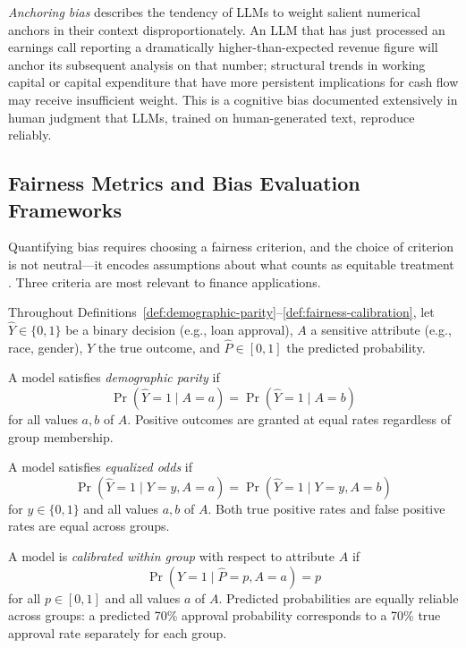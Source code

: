 \begin{context}
\emph{Anchoring bias} describes the tendency of LLMs to weight salient numerical anchors in their context disproportionately. An LLM that has just processed an earnings call reporting a dramatically higher-than-expected revenue figure will anchor its subsequent analysis on that number; structural trends in working capital or capital expenditure that have more persistent implications for cash flow may receive insufficient weight. This is a cognitive bias documented extensively in human judgment \cite{tversky1974judgment}
that LLMs, trained on human-generated text, reproduce reliably.

\subsection{Fairness Metrics and Bias Evaluation Frameworks}
\label{subsec:af-ethics-metrics}

Quantifying bias requires choosing a fairness criterion, and the choice of criterion is not neutral---it encodes assumptions about what counts as equitable treatment \cite{mehrabi2021survey}. Three criteria are most relevant to finance applications.

Throughout Definitions~\ref{def:demographic-parity}--\ref{def:fairness-calibration}, let $\hat{Y} \in \{0,1\}$ be a binary decision (e.g., loan approval), $A$ a sensitive attribute (e.g., race, gender), $Y$ the true outcome, and $\hat{P} \in [0,1]$ the predicted probability.

\begin{definition}
\label{def:demographic-parity}
A model satisfies \emph{demographic parity} if
\[
\Pr(\hat{Y} = 1 \mid A = a) = \Pr(\hat{Y} = 1 \mid A = b)
\]
for all values $a, b$ of $A$. Positive outcomes are granted at equal rates regardless of group membership.
\end{definition}

\begin{definition}
\label{def:equalized-odds}
A model satisfies \emph{equalized odds} if
\[
\Pr(\hat{Y} = 1 \mid Y = y, A = a) = \Pr(\hat{Y} = 1 \mid Y = y, A = b)
\]
for $y \in \{0, 1\}$ and all values $a, b$ of $A$. Both true positive rates and false positive rates are equal across groups.
\end{definition}

\begin{definition}
\label{def:fairness-calibration}
A model is \emph{calibrated within group} with respect to attribute $A$ if
\[
\Pr(Y = 1 \mid \hat{P} = p, A = a) = p
\]
for all $p \in [0,1]$ and all values $a$ of $A$. Predicted probabilities are equally reliable across groups: a predicted 70\% approval probability corresponds to a 70\% true approval rate separately for each group.
\end{definition}


\end{context}
